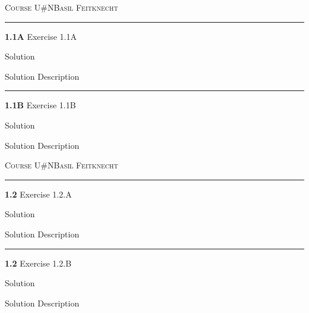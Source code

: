 \documentclass[12pt]{amsart}
\newcommand{\heading}{ {\scshape Course} \hfill U\#N\hfill {\scshape Basil Feitknecht} }
\newcommand{\newexer}{ \bigskip \bigskip \hrule \bigskip \bigskip }
\newcommand{\newpageexcer}{ \newpage \heading\smallskip \hrule \bigskip \bigskip }
\newcommand{\bigbigskip}{ \bigskip \bigskip }
\begin{document}
\newpageexcer\textbf{1.1A} Exercise 1.1A

\bigbigskip
Solution

\bigbigskip
Solution Description

\newexer
\textbf{1.1B} Exercise 1.1B

\bigbigskip

Solution

\bigbigskip

Solution Description

\newpageexcer

\textbf{1.2} Exercise 1.2.A

\bigbigskip

Solution

\bigbigskip

Solution Description

\newexer

\textbf{1.2} Exercise 1.2.B

\bigbigskip

Solution

\bigbigskip

Solution Description
\end{document}
